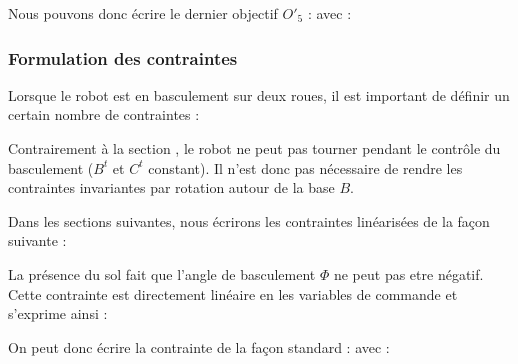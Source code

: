 					Nous pouvons donc écrire le dernier objectif $O'_5$ :
					avec : 

			\subsubsection{Formulation des contraintes}
			
				Lorsque le robot est en basculement sur deux roues, il est important de définir un certain nombre de contraintes :
				
				Contrairement à la section , le robot ne peut pas tourner pendant le contrôle du basculement ($B^t$ et $C^t$ constant).
				Il n'est donc pas nécessaire de rendre les contraintes invariantes par rotation autour de la base $B$.
				
				Dans les sections suivantes, nous écrirons les contraintes linéarisées de la façon suivante :
				
				
					La présence du sol fait que l'angle de basculement $\Phi$ ne peut pas etre négatif.
					Cette contrainte est directement linéaire en les variables de commande et s'exprime ainsi :
					
					On peut donc écrire la contrainte de la façon standard :
					avec :
				
